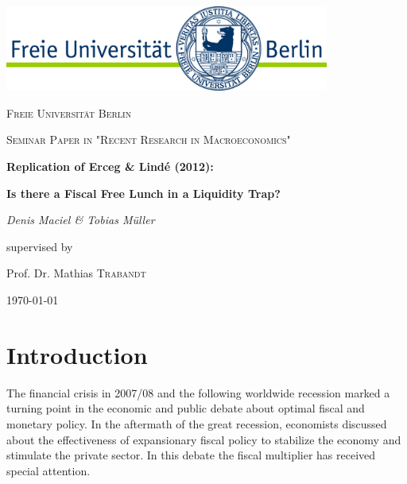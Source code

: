 \documentclass[12pt,a4paper,oneside,titlepage]{article}
\begin{document}
\parindent 0pt %
\begin{titlepage}
	\centering
	\includegraphics[width=0.8\textwidth]{pictures/LogoFU}\par\vspace{1cm}
	{\scshape\large Freie Universität Berlin \par}
	\vspace{1cm}
	{\scshape\large Seminar Paper in "Recent Research in Macroeconomics"\par}
	\vspace{1.5cm}
	{\LARGE\bfseries Replication of Erceg \& Lindé (2012):\par}
	\vspace{0.5cm}
	{\Large\bfseries Is there a Fiscal Free Lunch in a Liquidity Trap?\par}
	\vspace{2cm}
	{\Large\itshape Denis Maciel \& Tobias Müller\par}
	\vfill
	supervised by\par
	Prof. Dr. Mathias \textsc{Trabandt}

	\vfill

	{\large \today\par}
\end{titlepage}


\doublespacing
\tableofcontents

\pagebreak[4]
\listoffigures
\listoftables
\newpage

\section{Introduction}

The financial crisis in 2007/08 and the following worldwide recession marked a turning point in the economic and public debate about optimal fiscal and monetary policy. In the aftermath of the great recession, economists discussed about the effectiveness of expansionary fiscal policy to stabilize the economy and stimulate the private sector. In this debate the fiscal multiplier has received special attention.
\end{document}
